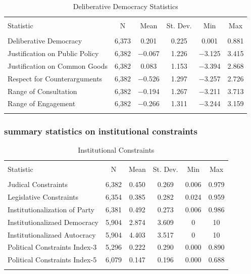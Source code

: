 \documentclass[12pt]{article}\usepackage[]{graphicx}\usepackage[]{color}
\begin{document}
\begin{table}[!htbp] \centering 
  \caption{Deliberative Democracy Statistics} 
  \label{delib} 
\begin{tabular}{@{\extracolsep{5pt}}lccccc} 
\\[-1.8ex]\hline \\[-1.8ex] 
Statistic & \multicolumn{1}{c}{N} & \multicolumn{1}{c}{Mean} & \multicolumn{1}{c}{St. Dev.} & \multicolumn{1}{c}{Min} & \multicolumn{1}{c}{Max} \\ 
\hline \\[-1.8ex] 
Deliberative Democracy & 6,373 & 0.201 & 0.225 & 0.001 & 0.881 \\ 
Justification on Public Policy & 6,382 & $-$0.067 & 1.226 & $-$3.125 & 3.415 \\ 
Justification on Common Goods & 6,382 & 0.083 & 1.153 & $-$3.394 & 2.868 \\ 
Respect for Counterarguments & 6,382 & $-$0.526 & 1.297 & $-$3.257 & 2.726 \\ 
Range of Consultation & 6,382 & $-$0.194 & 1.267 & $-$3.211 & 3.713 \\ 
Range of Engagement & 6,382 & $-$0.266 & 1.311 & $-$3.244 & 3.159 \\ 
\hline \\[-1.8ex] 
\end{tabular} 
\end{table} 


\subsubsection{summary statistics on institutional constraints}


\begin{table}[!htbp] \centering 
  \caption{Institutional Constraints} 
  \label{const} 
\begin{tabular}{@{\extracolsep{5pt}}lccccc} 
\\[-1.8ex]\hline 
\hline \\[-1.8ex] 
Statistic & \multicolumn{1}{c}{N} & \multicolumn{1}{c}{Mean} & \multicolumn{1}{c}{St. Dev.} & \multicolumn{1}{c}{Min} & \multicolumn{1}{c}{Max} \\ 
\hline \\[-1.8ex] 
Judical Constraints & 6,382 & 0.450 & 0.269 & 0.006 & 0.979 \\ 
Legislative Constraints & 6,354 & 0.385 & 0.282 & 0.024 & 0.959 \\ 
Institutionalization of Party & 6,381 & 0.492 & 0.273 & 0.006 & 0.986 \\ 
Institutionalizaed Democracy & 5,904 & 2.874 & 3.609 & 0 & 10 \\ 
Institutionalizaed Autocracy & 5,904 & 4.403 & 3.517 & 0 & 10 \\ 
Political Constraints Index-3 & 5,296 & 0.222 & 0.290 & 0.000 & 0.890 \\ 
Political Constraints Index-5 & 6,079 & 0.147 & 0.196 & 0.000 & 0.688 \\ 
\hline \\[-1.8ex] 
\end{tabular} 
\end{table} 
\end{document}
